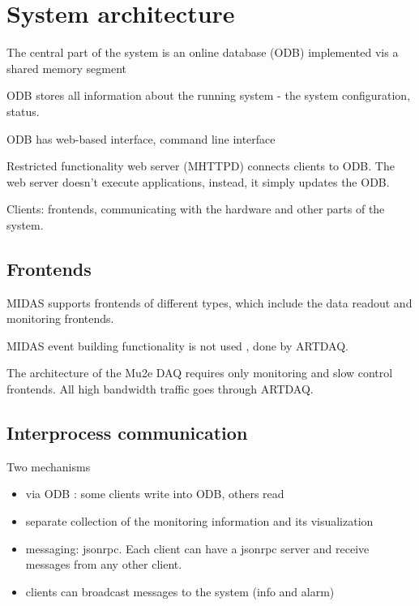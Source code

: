 \section{System architecture}

The central part of the system is an online database (ODB)
implemented vis a shared memory segment

ODB stores all information about the running system -
the system configuration, status.

ODB has web-based interface, command line interface

Restricted functionality web server (MHTTPD) connects clients
to ODB. The web server doesn't execute applications, instead,
it simply updates the ODB.

Clients: frontends, communicating with the hardware and other
parts of the system.


\subsection{Frontends}

MIDAS supports frontends of different types, which include the data readout and monitoring
frontends.

MIDAS event building functionality is not used , done by ARTDAQ.

The architecture of the Mu2e DAQ requires only monitoring and slow control frontends.
All high bandwidth traffic goes through ARTDAQ.

\subsection{Interprocess communication} 

Two mechanisms
\begin{itemize}
\item
  via ODB : some clients write into ODB, others read
\item
  separate collection of the monitoring information and its visualization
\item
  messaging: jsonrpc. Each client can have a jsonrpc server and receive messages
  from any other client.
\item
  clients can broadcast messages to the system (info and alarm)
\end{itemize}

